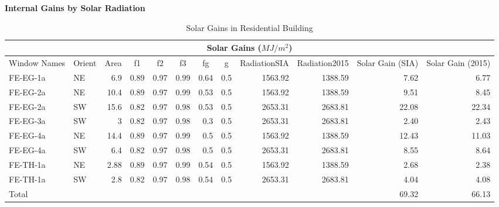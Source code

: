 \documentclass[a4paper, oneside]{discothesis}
\begin{document}
		\textbf{Internal Gains by Solar Radiation}\\
		\begin{table}[htbp]
		\centering
		\small
		\caption{Solar Gains in Residential Building}
		    \begin{tabular}{lrrrrrrrrrrr}
		    \toprule
		    \multicolumn{12}{c}{Solar Gains ($MJ/m^2$)} \\
		    \midrule
		    \multicolumn{1}{p{4.215em}}{Window Names} & \multicolumn{1}{c}{Orient} & \multicolumn{1}{c}{Area} & \multicolumn{1}{c}{f1} & \multicolumn{1}{c}{f2} & \multicolumn{1}{c}{f3} & \multicolumn{1}{c}{fg} & \multicolumn{1}{c}{g} & \multicolumn{1}{p{4.57em}}{Radiation\newline{}SIA} & \multicolumn{1}{p{4.57em}}{Radiation\newline{}2015} & \multicolumn{1}{p{3.8em}}{Solar Gain (SIA)} & \multicolumn{1}{p{3.8em}}{Solar Gain (2015)} \\
		    \midrule
		    FE-EG-1a & \multicolumn{1}{l}{NE} & 6.9   & 0.89  & 0.97  & 0.99  & 0.64  & 0.5   & 1563.92 & 1388.59 & 7.62  & 6.77 \\
		    FE-EG-2a & \multicolumn{1}{l}{NE} & 10.4  & 0.89  & 0.97  & 0.99  & 0.53  & 0.5   & 1563.92 & 1388.59 & 9.51  & 8.45 \\
		    FE-EG-2a & \multicolumn{1}{l}{SW} & 15.6  & 0.82  & 0.97  & 0.98  & 0.53  & 0.5   & 2653.31 & 2683.81 & 22.08 & 22.34 \\
		    FE-EG-3a & \multicolumn{1}{l}{SW} & 3     & 0.82  & 0.97  & 0.98  & 0.3   & 0.5   & 2653.31 & 2683.81 & 2.40  & 2.43 \\
		    FE-EG-4a & \multicolumn{1}{l}{NE} & 14.4  & 0.89  & 0.97  & 0.99  & 0.5   & 0.5   & 1563.92 & 1388.59 & 12.43 & 11.03 \\
		    FE-EG-4a & \multicolumn{1}{l}{SW} & 6.4   & 0.82  & 0.97  & 0.98  & 0.5   & 0.5   & 2653.31 & 2683.81 & 8.55  & 8.64 \\
		    FE-TH-1a & \multicolumn{1}{l}{NE} & 2.88  & 0.89  & 0.97  & 0.99  & 0.54  & 0.5   & 1563.92 & 1388.59 & 2.68  & 2.38 \\
		    FE-TH-1a & \multicolumn{1}{l}{SW} & 2.8   & 0.82  & 0.97  & 0.98  & 0.54  & 0.5   & 2653.31 & 2683.81 & 4.04  & 4.08 \\
		    \midrule
		    Total &       &       &       &       &       &       &       &       &       & 69.32 & 66.13 \\
		    \bottomrule
		    \end{tabular}%
		  \label{tab:HonggSolarGain}%
		\end{table}%
\end{document}
